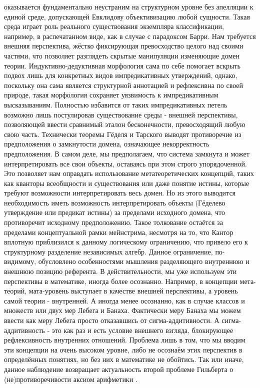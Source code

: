 \documentclass[12pt]{article}
\begin{document}
оказывается фундаментально неустраним на структурном уровне без апелляции к единой среде, допускающей Евклидову объективизацию любой сущности. Такая среда играет роль реального существования экземпляра классификации, например, в распечатанном виде, как в случае с парадоксом Барри. Нам требуется внешняя перспектива, жёстко фиксирующая превосходство целого над своими частями, что позволяет разглядеть скрытые манипуляции изменяющие домен теории. Индуктивно-дедуктивная морфология сама по себе помогает вскрыть подвох лишь для конкретных видов импредикативных утверждений, однако, поскольку она сама является структурной аннотацией и рефлексивна по своей природе, такая морфология сохраняет уязвимость к импредикативным высказываниям. Полностью избавится от таких импредикативных петель возможно лишь постулировав существование среды - внешней перспективы, позволяющей ввести сравнимый эталон бесконечности, превосходящий любую свою часть. Технически теоремы Гёделя и Тарского выводят противоречие из предположения о замкнутости домена, означающее некорректность предположения. В самом деле, мы предполагаем, что система замкнута и может интерпретировать все свои объекты, оставаясь при этом строго упорядоченной. Это позволяет нам оправдать использование метатеоретических концепций, таких как кванторы всеобщности и существования или даже понятие истины, которые требуют возможности интерпретировать весь домен. Но из этого выводится необходимость иметь возможность интерпретировать объекты (Гёделево утверждение или предикат истины) за пределами исходного домена, что противоречит исходному предположению. Такое толкование остаётся за пределами концептуальной рамки мейнстрима, несмотря на то, что Кантор вплотную приблизился к данному логическому ограничению, что привело его к структурному разделение независимых алгебр. Данное ограничение, по-видимому, обусловлено особенностями мышления разделяющего внутреннюю и внешнюю позицию референта. В действительности, мы уже используем эти перспективы в математике, иногда более осознанно. Например, в концепции мета-теорий, мата-уровень выступает в качестве внешней перспективы, а уровень самой теории - внутренней. А иногда менее осознанно, как в случае классов и множеств или двух мер Лебега и Банаха. Фактически меру Банаха мы можем ввести как меру Лебега просто отказавшись от сигма-аддитивности. А сигма-аддитивность - это как раз и есть условие внешнего взгляда, блокирующее рефлексивность внутренних отношений. Проблема лишь в том, что мы вводим эти концепции на очень высоком уровне, либо не осознаём этих перспектив в определённых понятиях, но без них в математике не обойтись. Так или иначе, данное наблюдение возвращает актуальность второй проблеме Гильберта о (не)противоречивости аксиом арифметики \cite{hilbert-problems}. 
\end{document}
